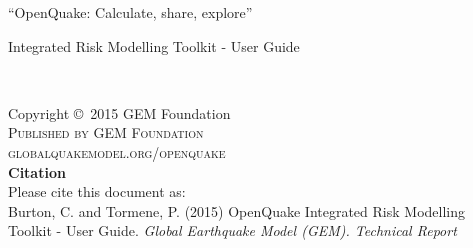 \documentclass[11pt,fleqn]{book} %
\begin{document}
%


\begingroup
\thispagestyle{empty}
\par\normalfont\fontsize{15}{15}\sffamily\selectfont
“OpenQuake: Calculate, share, explore”
\centering
\vspace*{9cm}
\par\normalfont\fontsize{35}{35}\sffamily\selectfont
Integrated Risk Modelling Toolkit - User Guide\par %
\endgroup


\newpage
~\vfill
\thispagestyle{empty}

\noindent Copyright \copyright\ 2015 GEM Foundation\\ %

\noindent \textsc{Published by GEM Foundation}\\ %

\noindent \textsc{globalquakemodel.org/openquake}\\ %

\noindent 
   {\textbf{Citation}} \hfill \\
   Please cite this document as:\\
   Burton, C. and Tormene, P. (2015) OpenQuake Integrated Risk Modelling
   Toolkit - User Guide. \textit{Global Earthquake Model (GEM). Technical
   Report}\\
   
\end{document}
